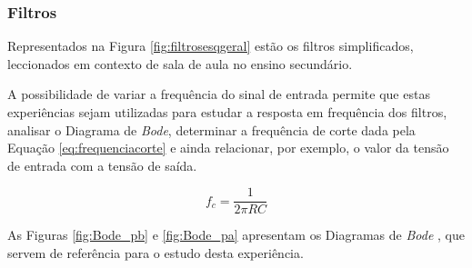 \subsubsection{Filtros}
\label{sec:filtros}
Representados na Figura \ref{fig:filtrosesqgeral} estão os filtros simplificados, leccionados em contexto de sala de aula no ensino secundário.

A possibilidade de variar a frequência do sinal de entrada permite que estas experiências sejam utilizadas para estudar a resposta em frequência dos filtros, analisar o Diagrama de \textit{Bode}, determinar a frequência de corte dada pela Equação \ref{eq:frequenciacorte} e ainda relacionar, por exemplo, o valor da tensão de entrada com a tensão de saída. 

\begin{equation} \label{eq:frequenciacorte}
	f_{c} = \frac{1}{2\pi RC}
\end{equation}

As Figuras \ref{fig:Bode_pb} e \ref{fig:Bode_pa} apresentam os Diagramas de \textit{Bode} , que servem de referência para o estudo desta experiência. 

